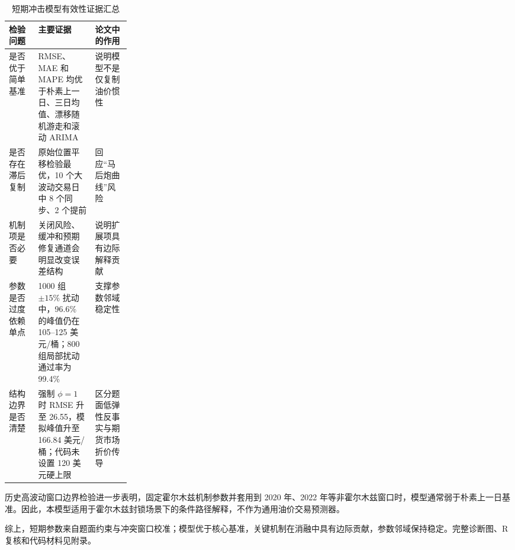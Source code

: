 \begin{table}[!htbp]
\centering
\caption{短期冲击模型有效性证据汇总}
\begin{tabularx}{\linewidth}{p{0.24\linewidth}X X}
\toprule
检验问题 & 主要证据 & 论文中的作用 \\
\midrule
是否优于简单基准 & RMSE、MAE 和 MAPE 均优于朴素上一日、三日均值、漂移随机游走和滚动 ARIMA & 说明模型不是仅复制油价惯性 \\
是否存在滞后复制 & 原始位置平移检验最优，10 个大波动交易日中 8 个同步、2 个提前 & 回应“马后炮曲线”风险 \\
机制项是否必要 & 关闭风险、缓冲和预期修复通道会明显改变误差结构 & 说明扩展项具有边际解释贡献 \\
参数是否过度依赖单点 & 1000 组 \(\pm15\%\) 扰动中，96.6\% 的峰值仍在 105--125 美元/桶；800 组局部扰动通过率为 99.4\% & 支撑参数邻域稳定性 \\
结构边界是否清楚 & 强制 \(\phi=1\) 时 RMSE 升至 26.55，模拟峰值升至 166.84 美元/桶；代码未设置 120 美元硬上限 & 区分题面低弹性反事实与期货市场折价传导 \\
\bottomrule
\end{tabularx}
\end{table}

历史高波动窗口边界检验进一步表明，固定霍尔木兹机制参数并套用到 2020 年、2022 年等非霍尔木兹窗口时，模型通常弱于朴素上一日基准。因此，本模型适用于霍尔木兹封锁场景下的条件路径解释，不作为通用油价交易预测器。

综上，短期参数来自题面约束与冲突窗口校准；模型优于核心基准，关键机制在消融中具有边际贡献，参数邻域保持稳定。完整诊断图、R 复核和代码材料见附录。
